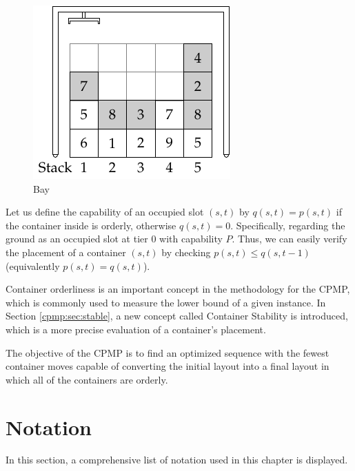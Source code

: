 \documentclass{article}
\begin{document}
\begin{figure}[htbp]
\centering
\includegraphics{figures/bay.pdf}
\caption{Bay}
\label{cpmp:fig:bay}
\end{figure}

Let us define the capability of an occupied slot $(s,t)$ by $q(s,t)=p(s,t)$ if the container inside is orderly, otherwise $q(s,t)=0$. Specifically, regarding the ground as an occupied slot at tier $0$ with capability $P$. Thus, we can easily verify the placement of a container $(s,t)$ by checking $p(s,t)\le q(s,t-1)$ (equivalently $p(s,t)=q(s,t)$).

Container orderliness is an important concept in the methodology for the CPMP, which is commonly used to measure the lower bound of a given instance. In Section \ref{cpmp:sec:stable}, a new concept called Container Stability is introduced, which is a more precise evaluation of a container's placement.

The objective of the CPMP is to find an optimized sequence with the fewest container moves capable of converting  the initial layout into a final layout in which all of the containers are orderly.

\section{Notation}

In this section, a comprehensive list of notation used in this chapter is displayed.

\newlength{\cpmpmylongest}
\settowidth{\cpmpmylongest}{$\alpha(s^+,s)$}
\addtolength{\cpmpmylongest}{\labelsep}
\end{document}
